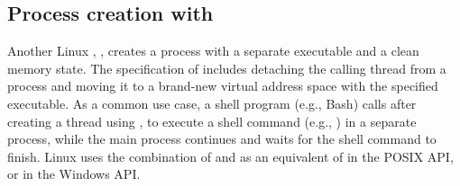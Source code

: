 \begin{comment}
\vspace{5pt}
\noindent{\bf Discussion.~}
A Graphene picoprocess can copy part or all its address space into a child
picoprocess relatively efficiently.
Although this mechanism is less efficient than an in-kernel {\tt fork},
we wanted to maintain the generality benefits of recent \liboses{},
and only added the minimal building blocks to the host ABI.
The transfer of data is explicit to the host, can be mediated by a reference monitor,
the sender, or the receiver.
For instance, recent Unix systems introduced a close-on-exec flag for file handles~\citep{close-on-exec}, 
which prevents inheritance of handles to sensitive files.  This can be implemented
either in a parent, by excluding the file handle from a checkpoint, 
or in the child, by closing this handle on an {\tt exec} call.
Our current implementation implements close-on-exec in the child for complete compatibility,
but a more security-sensitive application could easily implement ``close-on-fork'' semantics 
in the parent.
This clean division of labor retains full functionality
and facilitates extensibility.


\end{comment}



\subsection{Process creation with }


Another Linux \linuxapi{}, , creates a process with a separate executable and a clean memory state.
The specification of 
includes detaching the calling thread from a process and moving it to a brand-new virtual address space with the specified executable.
As a common use case, a shell program (e.g., Bash) calls  after creating a thread using ,
to execute a shell command (e.g., ) in a separate process, while the main process continues and waits for the shell command to finish.
Linux uses the combination of  and 
as an equivalent of  in the POSIX API, or  in the Windows API.


